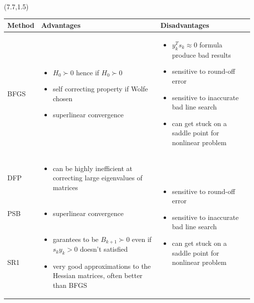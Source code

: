 \documentclass[a0]{a0poster}
\begin{document}
\begin{textblock}{7.1}(7.7,1.5)
\begin{flushleft}
	 \begin{tabular}{ p{3cm} |p{12cm} |p{12cm} }
	Method & Advantages & Disadvantages\\
	\hline
	BFGS & \begin{itemize}
		\item $H_0\succ 0$ hence if $H_0\succ 0$
		\item self correcting property if Wolfe chosen
		\item superlinear convergence
	\end{itemize} & \begin{itemize}
	\item $y_k^Ts_k \approx 0$ formula produce bad results
	\item sensitive to round-off error
	\item sensitive to inaccurate bad line search
	\item can get stuck on a saddle point for nonlinear problem
\end{itemize}\\ 
	\hline
	DFP &  \begin{itemize}
		\item  can be highly inefficient at correcting
		large eigenvalues of matrices
	\end{itemize}&\multirow{3}{12cm}{
	\begin{itemize}
		\item sensitive to round-off error
		\item sensitive to inaccurate bad line search
		\item can get stuck on a saddle point for nonlinear problem
	\end{itemize}
	}\\
	\cline{1-2}
	PSB & \begin{itemize}
		\item superlinear convergence
	\end{itemize}\\
	\cline{1-2}
	SR1 & \begin{itemize}
		\item garantees to be $B_{k+1}\succ 0$ even if $s_k y_k > 0$ doesn't satisfied
		\item very good approximations to the  Hessian matrices, often better than BFGS
	\end{itemize} \\

\end{tabular}
	

\end{flushleft}
\end{textblock}
\end{document}
